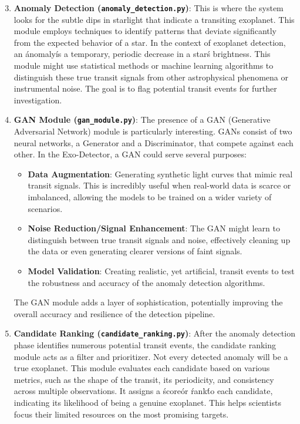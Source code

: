 \documentclass{article}
\begin{document}
\begin{enumerate}
    \setcounter{enumi}{2} %
    \item \textbf{Anomaly Detection (\texttt{anomaly\_detection.py})}: This is where the system looks for the subtle dips in starlight that indicate a transiting exoplanet. This module employs techniques to identify patterns that deviate significantly from the expected behavior of a star. In the context of exoplanet detection, an \'anomaly\' is a temporary, periodic decrease in a star\'s brightness. This module might use statistical methods or machine learning algorithms to distinguish these true transit signals from other astrophysical phenomena or instrumental noise. The goal is to flag potential transit events for further investigation.

    \item \textbf{GAN Module (\texttt{gan\_module.py})}: The presence of a GAN (Generative Adversarial Network) module is particularly interesting. GANs consist of two neural networks, a Generator and a Discriminator, that compete against each other. In the Exo-Detector, a GAN could serve several purposes:
    \begin{itemize}
        \item \textbf{Data Augmentation}: Generating synthetic light curves that mimic real transit signals. This is incredibly useful when real-world data is scarce or imbalanced, allowing the models to be trained on a wider variety of scenarios.
        \item \textbf{Noise Reduction/Signal Enhancement}: The GAN might learn to distinguish between true transit signals and noise, effectively cleaning up the data or even generating clearer versions of faint signals.
        \item \textbf{Model Validation}: Creating realistic, yet artificial, transit events to test the robustness and accuracy of the anomaly detection algorithms.
    \end{itemize}

    The GAN module adds a layer of sophistication, potentially improving the overall accuracy and resilience of the detection pipeline.

    \item \textbf{Candidate Ranking (\texttt{candidate\_ranking.py})}: After the anomaly detection phase identifies numerous potential transit events, the candidate ranking module acts as a filter and prioritizer. Not every detected anomaly will be a true exoplanet. This module evaluates each candidate based on various metrics, such as the shape of the transit, its periodicity, and consistency across multiple observations. It assigns a \'score\' or \'rank\' to each candidate, indicating its likelihood of being a genuine exoplanet. This helps scientists focus their limited resources on the most promising targets.
\end{enumerate}
\end{document}
